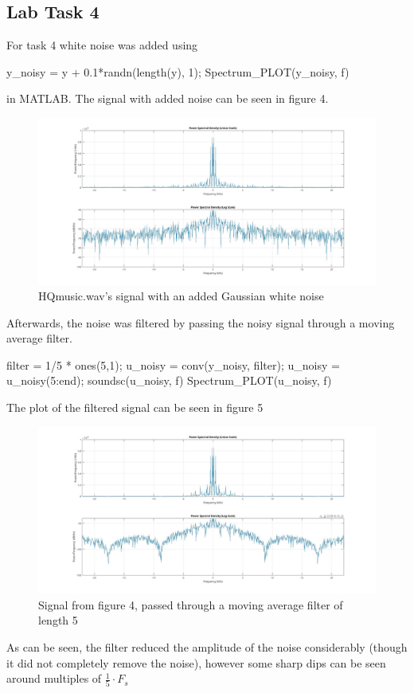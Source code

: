 \documentclass[a4paper,11pt]{article}
\begin{document}
\subsection{Lab Task 4}
For task 4 white noise was added using 
\begin{ffcode}
y_noisy = y + 0.1*randn(length(y), 1);
Spectrum_PLOT(y_noisy, f)
\end{ffcode}
in MATLAB. The signal with added noise can be seen in figure 4.
\begin{figure}[H]
    \hspace{-55pt}\includegraphics[scale=0.28]{./images/Task4-noisy.jpg}
    \caption{HQmusic.wav's signal with an added Gaussian white noise}
    \label{fig:my_label}
\end{figure}

Afterwards, the noise was filtered by passing the noisy signal through a moving average filter.
\begin{ffcode}
filter = 1/5 * ones(5,1);
u_noisy = conv(y_noisy, filter);
u_noisy = u_noisy(5:end);
soundsc(u_noisy, f)
Spectrum_PLOT(u_noisy, f)
\end{ffcode}
The plot of the filtered signal can be seen in figure 5
\begin{figure}[H]
    \hspace{-40pt}\includegraphics[scale=0.28]{./images/Task4-filtered}
    \caption{Signal from figure 4, passed through a moving average filter of length 5}
    \label{fig:my_label}
\end{figure}
As can be seen, the filter reduced the amplitude of the noise considerably (though it did not completely remove the noise), however some sharp dips can be seen around multiples of $\frac{1}{5} \cdot F_s$
\end{document}
